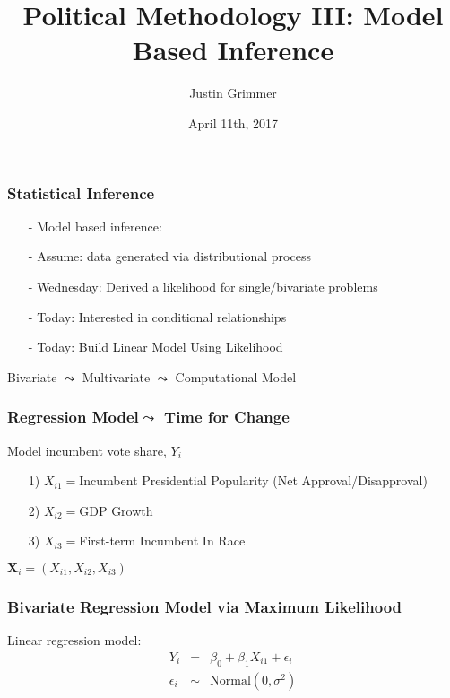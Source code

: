 \documentclass{beamer}
\title[Methodology III] %
{Political Methodology III: Model Based Inference}
\author{Justin Grimmer}
\institute[Stanford University]{Associate Professor\\Department of Political Science \\  Stanford University}
\date{April 11th, 2017}
\begin{document}
\begin{frame}
\titlepage
\end{frame}




\begin{frame}
\frametitle{Statistical Inference}


\begin{itemize}
\item[-] Model based inference:
\item[-] \alert{Assume}: data generated via distributional process
\item[-] Wednesday: Derived a likelihood for single/bivariate problems
\item[-] Today: Interested in conditional relationships
\item[-] Today: Build Linear Model Using Likelihood
\end{itemize}
Bivariate \alert{$\leadsto$} Multivariate $\leadsto$ Computational Model
\end{frame}


\begin{frame}
\frametitle{Regression Model$\leadsto$ Time for Change}

Model incumbent vote share, $Y_{i}$
\begin{itemize}
\item[1)] $X_{i1} = $Incumbent Presidential Popularity (Net Approval/Disapproval)
\item[2)] $X_{i2} = $GDP Growth
\item[3)] $X_{i3} = $First-term Incumbent In Race
\end{itemize}
$\boldsymbol{X}_{i} = (X_{i1}, X_{i2}, X_{i3})$





\end{frame}


\begin{frame}
\frametitle{Bivariate Regression Model via Maximum Likelihood}

Linear regression model:
\begin{eqnarray}
Y_{i} & = & \beta_{0} + \beta_{1}X_{i1} + \epsilon_{i} \nonumber \\
\epsilon_{i} & \sim & \text{Normal}(0, \sigma^{2}) \nonumber
\end{eqnarray}
\pause
{} \pause



\end{frame}
\end{document}

